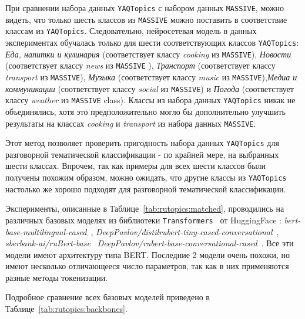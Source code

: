 При сравнении набора данных \texttt{YAQTopics} с набором данных \texttt{MASSIVE}, можно видеть, что только шесть классов из \texttt{MASSIVE} можно поставить в соответствие классам из  \texttt{YAQTopics}. Следовательно, нейросетевая модель в данных экспериментах обучалась только для шести соответствующих классов \texttt{YAQTopics}: \textit{Еда, напитки и кулинария} (соответствует классу \textit{cooking} из \texttt{MASSIVE}), \textit{Новости} (соответствует классу \textit{news} из \texttt{MASSIVE} ), \textit{Транспорт} (соответствует классу \textit{transport} из \texttt{MASSIVE}), \textit{Музыка} (соответствует классу \textit{music} из \texttt{MASSIVE}),\textit{Медиа и коммуникации} (соответствует классу \textit{social} из \texttt{MASSIVE}) и \textit{Погода} (соответствует классу \textit{weather} из \texttt{MASSIVE} class). Классы из набора данных \texttt{YAQTopics} никак не объединялись, хотя это предположительно могло бы дополнительно улучшить результаты на классах \textit{cooking} и \textit{transport} из набора данных \texttt{MASSIVE}. 

Этот метод позволяет проверить пригодность набора данных \texttt{YAQTopics} для разговорной тематической классификации - по крайней мере, на выбранных шести классах. Впрочем, так как примеры для всех шести классов были получены похожим образом, можно ожидать, что другие классы из \texttt{YAQTopics} настолько же хорошо подходят для разговорной тематической классификации. 


Эксперименты, описанные в Таблице~\ref{tab:rutopics:matched}, проводились на различных базовых моделях из библиотеки \texttt{Transformers}~\cite{huggingface_transformers} от HuggingFace : \textit{bert-base-multilingual-cased}~\cite{multilingual_bert}, \textit{DeepPavlov/distilrubert-tiny-cased-conversational}~\cite{distilrubert}, \textit{sberbank-ai/ruBert-base}~\cite{sbert_base}  \textit{DeepPavlov/rubert-base-conversational-cased}~\cite{rubert}. Все эти модели имеют архитектуру типа BERT. Последние 2 модели очень похожи, но имеют несколько отличающееся число параметров, так как в них применяются разные методы токенизации. 

Подробное сравнение всех базовых моделей приведено в Таблице~\ref{tab:rutopics:backbones}.

